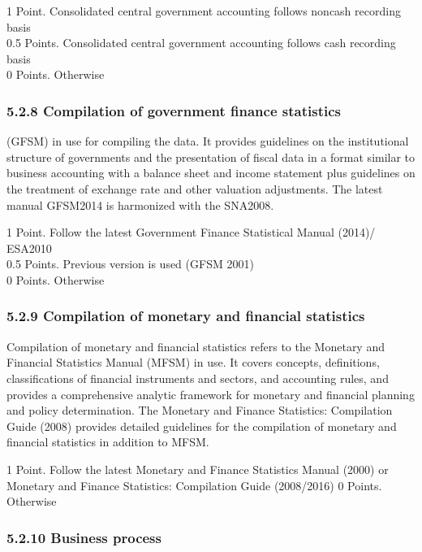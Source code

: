 \documentclass[]{article}
\begin{document}
1 Point. Consolidated central government accounting follows noncash
recording basis\\
0.5 Points. Consolidated central government accounting follows cash
recording basis\\
0 Points. Otherwise

\hypertarget{compilation-of-government-finance-statistics}{%
\subsubsection{5.2.8 Compilation of government finance
statistics}\label{compilation-of-government-finance-statistics}}

(GFSM) in use for compiling the data. It provides guidelines on the
institutional structure of governments and the presentation of fiscal
data in a format similar to business accounting with a balance sheet and
income statement plus guidelines on the treatment of exchange rate and
other valuation adjustments. The latest manual GFSM2014 is harmonized
with the SNA2008.

1 Point. Follow the latest Government Finance Statistical Manual (2014)/
ESA2010\\
0.5 Points. Previous version is used (GFSM 2001)\\
0 Points. Otherwise

\hypertarget{compilation-of-monetary-and-financial-statistics}{%
\subsubsection{5.2.9 Compilation of monetary and financial
statistics}\label{compilation-of-monetary-and-financial-statistics}}

Compilation of monetary and financial statistics refers to the Monetary
and Financial Statistics Manual (MFSM) in use. It covers concepts,
definitions, classifications of financial instruments and sectors, and
accounting rules, and provides a comprehensive analytic framework for
monetary and financial planning and policy determination. The Monetary
and Finance Statistics: Compilation Guide (2008) provides detailed
guidelines for the compilation of monetary and financial statistics in
addition to MFSM.

1 Point. Follow the latest Monetary and Finance Statistics Manual (2000)
or Monetary and Finance Statistics: Compilation Guide (2008/2016) 0
Points. Otherwise

\hypertarget{business-process}{%
\subsubsection{5.2.10 Business process}\label{business-process}}
\end{document}
